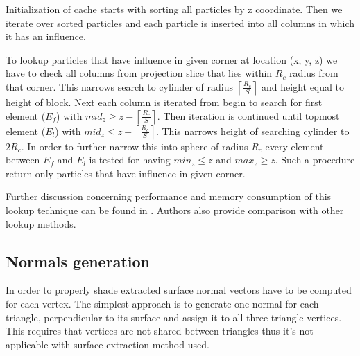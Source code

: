 
Initialization of cache starts with sorting all particles by z coordinate. Then we iterate over sorted particles and each particle is inserted into all columns in which it has an influence. 

To lookup particles that have influence in given corner at location (x, y, z) we have to check all columns from projection slice that lies within $R_c$ radius from that corner. This narrows search to cylinder of radius $\left \lceil \frac{R_c}{S} \right \rceil$ and height equal to height of block. Next each column is iterated from begin to search for first element ($E_f$) with $mid_z \geq z - \left \lceil \frac{R_c}{S} \right \rceil$. Then iteration is continued until topmost element ($E_l$) with $mid_z \leq  z + \left \lceil \frac{R_c}{S} \right \rceil$. This narrows height of searching cylinder to $2R_c$. In order to further narrow this into sphere of radius $R_c$  every element between $E_f$ and $E_l$ is tested for having $min_z \leq z$ and $max_z \geq z$. Such a procedure return only particles that have influence in given corner. 

Further discussion concerning performance and memory consumption of this lookup technique can be found in \cite{RosenbergBirdwell2008}. Authors also provide comparison with other lookup methods. 

\subsection{Normals generation}\label{sec:normals}
In order to properly shade extracted surface normal vectors have to be computed for each vertex. The simplest approach is to generate one normal for each triangle, perpendicular to its surface and assign it to all three triangle vertices. This requires that vertices are not shared between triangles thus it's not applicable with surface extraction method used. 

